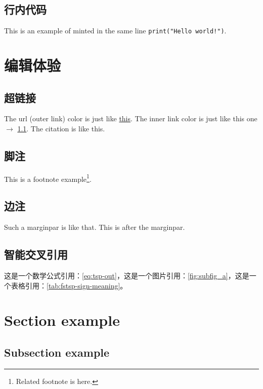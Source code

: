 \documentclass[fontset=none]{ctexart}
\begin{document}
\subsection{行内代码}

This is an example of minted in the same line \texttt{print("Hello world!")}.

\section{编辑体验}

\subsection{超链接}\label{sec:hyperlink}

The url (outer link) color is just like \href{https://chen-huaneng.github.io/}{this}. The inner link color is just like this one $\rightarrow$ \ref{sec:hyperlink}. The citation is like this\cite{2009A}.

\subsection{脚注}

This is a footnote example\footnote{Related footnote is here.}.

\subsection{边注}

Such a marginpar is like that.  This is after the marginpar.

\subsection{智能交叉引用}

这是一个数学公式引用：\autoref{eq:tsp-out}，这是一个图片引用：\autoref{fig:subfig_a}，这是一个表格引用：\autoref{tab:fstsp-sign-meaning}。

\section{Section example}

\subsection{Subsection example}
\end{document}
